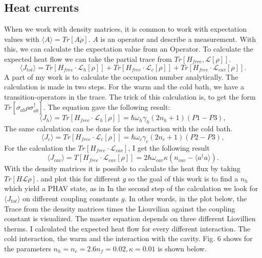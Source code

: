 \documentclass[12pt,a4paper]{article}
\begin{document}
\subsection{Heat currents}
 When we work with density matrices, it is common to work with expectation values with $\langle A \rangle=Tr[A\dot{\rho}]$.
 $A$ is an operator and describe a measurement.
With this, we can calculate the expectation value from an Operator. 
To calculate the expected heat flow we can take the partial trace from $Tr[H_{frre},\mathcal{L}[\rho]]$. 
\begin{equation}
\langle J_{tot}\rangle=Tr[H_{free}\cdot \mathcal{L}_h[\rho]]+Tr[H_{free}\cdot \mathcal{L}_c[\rho]]+Tr[H_{free}\cdot \mathcal{L}_{cav}[\rho]].\label{13}
\end{equation}
A part of my work is to calculate the occupation number analytically. 
The calculation is made in two steps. For the warm and the cold bath, we have a transition-operators in the trace.
The trick of this calculation is, to get the form $Tr[\sigma_{ab}\rho \sigma_{ab}^{\dag{}}]$.
The equation gave the following result:
\begin{equation}
\langle J_h \rangle=Tr[H_{free}\cdot \mathcal{L}_h[\rho]]=\hbar \omega_h \gamma_h (2n_h+1) ( P1-P3) ,
\end{equation}
The same calculation can be done for the interaction with the cold bath.
\begin{equation}
\langle J_c \rangle=Tr[H_{free}\cdot \mathcal{L}_c[\rho]]=\hbar \omega_c \gamma_c (2n_c+1) ( P2-P3) ,
\end{equation}
For the calculation the $Tr[H_{free}\cdot \mathcal{L}_{cav}]$, I get the following result
\begin{equation}
\langle J_{cav}\rangle=T[H_{free}\cdot \mathcal{L}_{cav}[\rho]]=2\hbar \omega_{cav}\kappa (n_{cav}-\langle a^{\dag{}}a \rangle).
\end{equation}
With the density matrices it is possible to calculate the heat flux by taking $Tr[H \mathcal{L}\rho]$. 
and plot this for different  $g$ 
so the goal of this work is to find a $n_h$ which yield a PHAV state,
as in \cite{Allevi2013}   %
In the second step of the calculation we look for $ \langle J_{tot}\rangle$ on different coupling constants $g$.
In other words, in the plot below, the Trace from the density matrices times the Liouvilian against the coupling constant is visualized.
The master equation depends on three different Liovillien therms. I calculated the expected heat flow for every different interaction. The cold interaction, the warm and the interaction with the cavity.
Fig. 6 shows  for the parameters $n_h=n_c=2.6 n_f=0.02,\kappa=0.01 $ is shown below.
\end{document}
